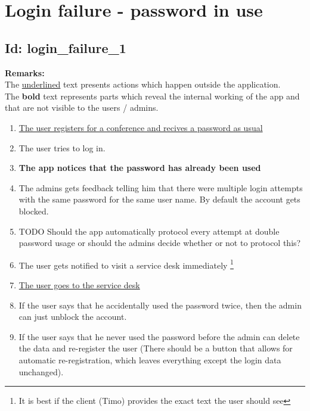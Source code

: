 \documentclass{article}
\begin{document}
\section*{Login failure - password in use}
\subsection*{Id: login\_failure\_1}
\noindent
\textbf{Remarks:}\\
 The \underline{underlined} text presents actions which happen outside the application. \\
 The \textbf{bold} text represents parts which reveal the internal working of the app and that are not visible to the users / admins.
\begin{enumerate}
	\item \underline{The user registers for a conference and recives a password as usual}
	\item The user tries to log in.
	\item \textbf{The app notices that the password has already been used}
	\item The admins gets feedback telling him that there were multiple login attempts with the same password for the same user name. By default the account gets blocked.
	\item TODO Should the app automatically protocol every attempt at double password usage or should the admins decide whether or not to protocol this?
	\item The user gets notified to visit a service desk immediately \footnote{It is best if the client (Timo) provides the exact text the user should see }
	\item \underline{The user goes to the service desk}
	\item If the user says that he accidentally used the password twice, then the admin can just unblock the account.
	\item If the user says that he never used the password before the admin can delete the data and re-register the user (There should be a button that allows for automatic re-registration, which leaves everything except the login data unchanged).

\end{enumerate}
\end{document}
